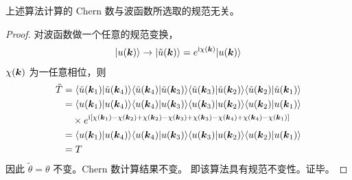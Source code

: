 \begin{theorem}
上述算法计算的 Chern 数与波函数所选取的规范无关。
\end{theorem}

\begin{proof}
对波函数做一个任意的规范变换，
\begin{align}
|u(\boldsymbol{k})\rangle \rightarrow |\tilde{u}(\boldsymbol{k})\rangle = e^{\mathrm{i}\chi(\boldsymbol{k})}|u(\boldsymbol{k})\rangle
\end{align}
$\chi(\boldsymbol{k})$ 为一任意相位，则
\begin{align}
\tilde{T} 
&= \langle\tilde{u}(\boldsymbol{k}_1)|\tilde{u}(\boldsymbol{k}_4)\rangle\langle\tilde{u}(\boldsymbol{k}_4)|\tilde{u}(\boldsymbol{k}_3)\rangle\langle\tilde{u}(\boldsymbol{k}_3)|\tilde{u}(\boldsymbol{k}_2)\rangle\langle\tilde{u}(\boldsymbol{k}_2)|\tilde{u}(\boldsymbol{k}_1)\rangle \\
&= \langle u(\boldsymbol{k}_1)|u(\boldsymbol{k}_4)\rangle\langle u(\boldsymbol{k}_4)|u(\boldsymbol{k}_3)\rangle\langle u(\boldsymbol{k}_3)|u(\boldsymbol{k}_2)\rangle\langle u(\boldsymbol{k}_2)|u(\boldsymbol{k}_1)\rangle \nonumber\\
& \quad \times e^{\mathrm{i}[\chi(\boldsymbol{k}_1)-\chi(\boldsymbol{k}_2)+\chi(\boldsymbol{k}_2)-\chi(\boldsymbol{k}_3)+\chi(\boldsymbol{k}_3)-\chi(\boldsymbol{k}_4)+\chi(\boldsymbol{k}_4)-\chi(\boldsymbol{k}_1)]} \\ 
&= \langle u(\boldsymbol{k}_1)|u(\boldsymbol{k}_4)\rangle\langle u(\boldsymbol{k}_4)|u(\boldsymbol{k}_3)\rangle\langle u(\boldsymbol{k}_3)|u(\boldsymbol{k}_2)\rangle\langle u(\boldsymbol{k}_2)|u(\boldsymbol{k}_1)\rangle \\
&= T
\end{align}
因此 $\tilde{\theta} = \theta$ 不变。Chern 数计算结果不变。
即该算法具有规范不变性。证毕。
\end{proof}


